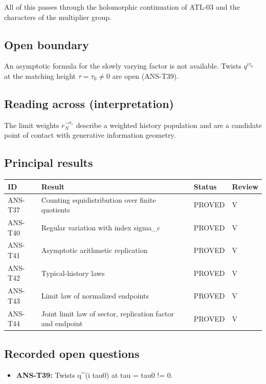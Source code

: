 \documentclass[
  11pt,
]{article}
\providecommand{\tightlist}{%
  \setlength{\itemsep}{0pt}\setlength{\parskip}{0pt}}
\begin{document}
All of this passes through the holomorphic continuation of ATL-03 and
the characters of the multiplier group.

\hypertarget{open-boundary-4}{%
\subsection{Open boundary}\label{open-boundary-4}}

An asymptotic formula for the slowly varying factor is not available.
Twists \(q^{i\tau_0}\) at the matching height \(\tau=\tau_0\ne0\) are
open (ANS-T39).

\hypertarget{reading-across-interpretation-4}{%
\subsection{Reading across
(interpretation)}\label{reading-across-interpretation-4}}

The limit weights \(r_N^{-\sigma_c}\) describe a weighted history
population and are a candidate point of contact with generative
information geometry.

\hypertarget{principal-results-4}{%
\subsection{Principal results}\label{principal-results-4}}

\begin{longtable}[]{@{}llll@{}}
\toprule
ID & Result & Status & Review\tabularnewline
\midrule
\endhead
ANS-T37 & Counting equidistribution over finite quotients & PROVED &
V\tabularnewline
ANS-T40 & Regular variation with index sigma\_c & PROVED &
V\tabularnewline
ANS-T41 & Asymptotic arithmetic replication & PROVED & V\tabularnewline
ANS-T42 & Typical-history laws & PROVED & V\tabularnewline
ANS-T43 & Limit law of normalized endpoints & PROVED & V\tabularnewline
ANS-T44 & Joint limit law of sector, replication factor and endpoint &
PROVED & V\tabularnewline
\bottomrule
\end{longtable}

\hypertarget{recorded-open-questions-3}{%
\subsection{Recorded open questions}\label{recorded-open-questions-3}}

\begin{itemize}
\tightlist
\item
  \textbf{ANS-T39:} Twists q\^{}(i tau0) at tau = tau0 != 0.
\end{itemize}
\end{document}
